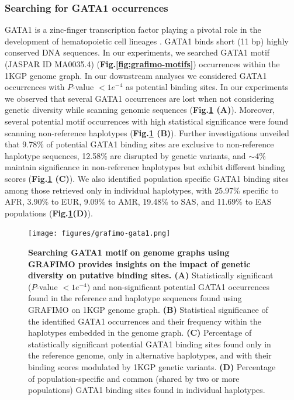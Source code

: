 \documentclass[a4paper, titlepage, openright]{book}
\newcommand{\grafimo}{GRAFIMO\xspace}
\begin{document}
\subsubsection{Searching for GATA1 occurrences}
GATA1 is a zinc-finger transcription factor playing a pivotal role in the development of hematopoietic cell lineages \citep{calligaris1995alternative}. GATA1 binds short (11 bp) highly conserved DNA sequences. In our experiments, we searched GATA1 motif (JASPAR ID MA0035.4) (\textbf{Fig.\ref{fig:grafimo-motifs}}) occurrences within the 1KGP genome graph. In our downstream analyses we considered GATA1 occurrences with $P$-value $< 1e^{-4}$ as potential binding sites. In our experiments we observed that several GATA1 occurrences are lost when not considering genetic diversity while scanning genomic sequences (\textbf{Fig.\ref{fig:grafimo-gata1} (A)}). Moreover, several potential motif occurrences with high statistical significance were found scanning non-reference haplotypes (\textbf{Fig.\ref{fig:grafimo-gata1} (B)}). Further investigations unveiled that 9.78\% of potential GATA1 binding sites are exclusive to non-reference haplotype sequences, 12.58\% are disrupted by genetic variants, and $\sim$4\% maintain significance in non-reference haplotypes but exhibit different binding scores (\textbf{Fig.\ref{fig:grafimo-gata1} (C)}). We also identified population specific GATA1 binding sites among those retrieved only in individual haplotypes, with 25.97\% specific to AFR, 3.90\% to EUR, 9.09\% to AMR, 19.48\% to SAS, and 11.69\% to EAS populations (\textbf{Fig.\ref{fig:grafimo-gata1}(D)}).

\begin{figure}
    \centering
    \texttt{[image: figures/grafimo-gata1.png]}
    \caption[Searching GATA1 motif on genome graphs using \grafimo provides insights on the impact of genetic diversity on putative binding sites]{\textbf{Searching GATA1 motif on genome graphs using \grafimo provides insights on the impact of genetic diversity on putative binding sites. (A)} Statistically significant ($P$-value $< 1e^{-4}$) and non-significant potential GATA1 occurrences found in the reference and haplotype sequences found using \grafimo on 1KGP genome graph. \textbf{(B)} Statistical significance of the identified GATA1 occurrences and their frequency within the haplotypes embedded in the genome graph. \textbf{(C)} Percentage of statistically significant potential GATA1 binding sites found only in the reference genome, only in alternative haplotypes, and with their binding scores modulated by 1KGP genetic variants. \textbf{(D)} Percentage of population-specific and common (shared by two or more populations) GATA1 binding sites found in individual haplotypes.}
    \label{fig:grafimo-gata1}
\end{figure}
\end{document}
